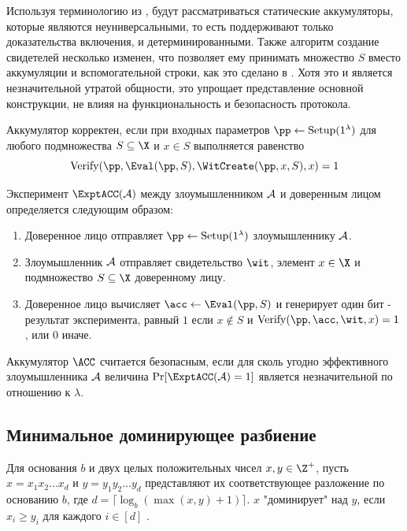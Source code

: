 Используя терминологию из \cite{cryptoeprint:2015/087}, будут рассматриваться статические аккумуляторы, которые являются неуниверсальными, то есть поддерживают только доказательства включения, и детерминированными.
Также алгоритм создание свидетелей несколько изменен, что позволяет ему принимать множество $S$ вместо аккумуляции и вспомогательной строки, как это сделано в \cite{cryptoeprint:2015/087}.
Хотя это и является незначительной утратой общности, это упрощает представление основной конструкции, не влияя на функциональность и безопасность протокола.

\begin{definition}
	Аккумулятор корректен, если при входных параметров $\pp \leftarrow \Setup(1^\lambda)$ для любого подмножества $S \subseteq \X$ и $x \in S$ выполняется равенство
	$$
	\Verify(\pp, \Eval(\pp, S), \WitCreate(\pp, x, S), x) = 1
	$$
\end{definition}

\begin{definition}[$\ExptACC$]
	Эксперимент $\ExptACC(\A)$ между злоумышленником $\mathcal{A}$ и доверенным лицом определяется следующим образом:
	\begin{enumerate}
		\item Доверенное лицо отправляет $\pp \leftarrow \Setup(1^\lambda)$ злоумышленнику $\mathcal{A}$.
		\item Злоумышленник $\mathcal{A}$ отправляет свидетельство $\wit$, элемент $x \in \X$ и подмножество $S \subseteq \X$ доверенному лицу.
		\item Доверенное лицо вычисляет $\acc \leftarrow \Eval(\pp, S)$ и генерирует один бит - результат эксперимента, равный $1$ если $x \notin S$ и $\Verify(\pp, \acc, \wit, x) = 1$, или $0$ иначе.
	\end{enumerate}
\end{definition}

\begin{definition}
	Аккумулятор $\ACC$ считается безопасным, если для сколь угодно эффективного злоумышленника $\mathcal{A}$ величина $\Pr[\ExptACC(\A) = 1]$ является незначительной по отношению к $\lambda$.
\end{definition}

\subsection{Минимальное доминирующее разбиение} %
\begin{definition}[Доминирование]
	Для основания $b$ и двух целых положительных чисел $x, y \in \Z^+$, пусть $x = x_1 x_2 \dots x_d$ и $y = y_1 y_2 \dots y_d$ представляют их соответствующее разложение по основанию $b$, где $d = \lceil \log_b(\max(x, y) + 1) \rceil$.
	$x$ "доминирует" над $y$, если $x_i \geq y_i$ для каждого $i \in [d]$ \cite{BonehShoup2023}.
\end{definition}

